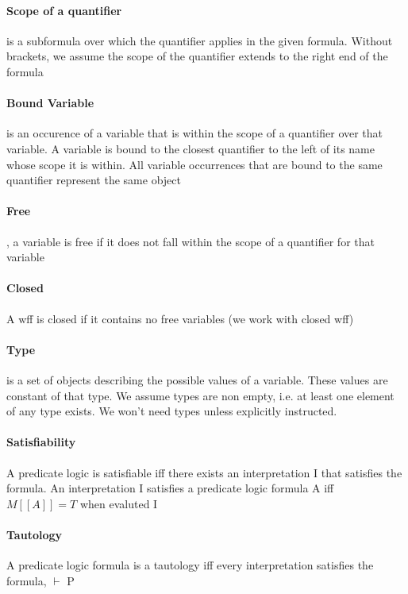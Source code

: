     \paragraph{Scope of a quantifier} is a subformula over which the quantifier
    applies in the given formula. Without brackets, we assume the scope of the
    quantifier extends to the right end of the formula

    \paragraph{Bound Variable} is an occurence of a variable that is within the
    scope of a quantifier over that variable. A variable is bound to the
    closest quantifier to the left of its name whose scope it is within. All
    variable occurrences that are bound to the same quantifier represent the
    same object

    \paragraph{Free}, a variable is free if it does not fall within the scope of
    a quantifier for that variable

    \paragraph{Closed} A wff is closed if it contains no free variables (we
    work with closed wff)

    \paragraph{Type} is a set of objects describing the possible values of a
    variable. These values are constant of that type. We assume types are non
    empty, i.e. at least one element of any type exists. We won't need types
    unless explicitly instructed.

    \paragraph{Satisfiability} A predicate logic is satisfiable iff there
    exists an interpretation I that satisfies the formula. An interpretation I
    satisfies a predicate logic formula A iff $M[[A]] = T$ when evaluted I

    \paragraph{Tautology} A predicate logic formula is a tautology iff every
    interpretation satisfies the formula, $\vdash$ P


